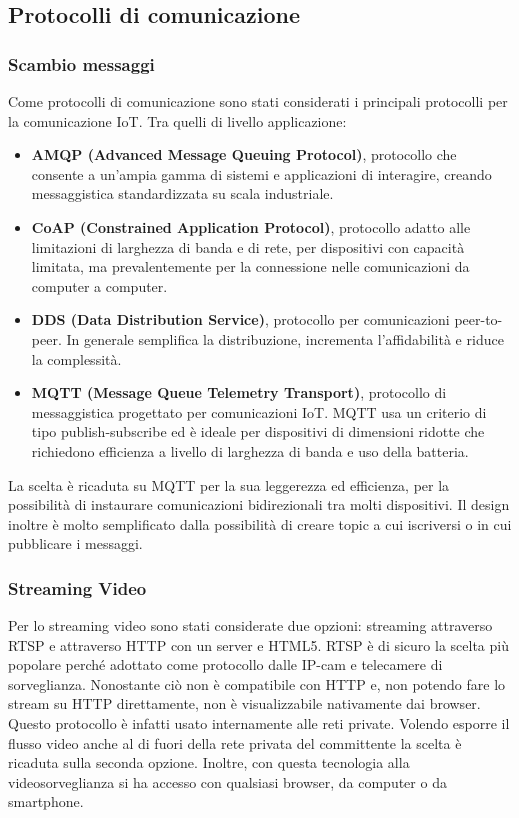         \subsection{Protocolli di comunicazione}
        \subsubsection{Scambio messaggi}
        Come protocolli di comunicazione sono stati considerati i principali protocolli per la comunicazione IoT. Tra quelli di livello applicazione: 
        \begin{itemize}
            \item \textbf{AMQP (Advanced Message Queuing Protocol)}, protocollo che consente a un'ampia gamma di sistemi e applicazioni di interagire, creando messaggistica standardizzata su scala industriale.
            \item \textbf{CoAP (Constrained Application Protocol)}, protocollo adatto alle limitazioni di larghezza di banda e di rete, per dispositivi con capacità limitata, ma prevalentemente per la connessione nelle comunicazioni da computer a computer. 
            \item \textbf{DDS (Data Distribution Service)}, protocollo per comunicazioni peer-to-peer. In generale semplifica la distribuzione, incrementa l'affidabilità e riduce la complessità.
            \item \textbf{MQTT (Message Queue Telemetry Transport)}, protocollo di messaggistica progettato per comunicazioni IoT. MQTT usa un criterio di tipo publish-subscribe ed è ideale per dispositivi di dimensioni ridotte che richiedono efficienza a livello di larghezza di banda e uso della batteria.
        \end{itemize}
        La scelta è ricaduta su MQTT per la sua leggerezza ed efficienza, per la possibilità di instaurare comunicazioni bidirezionali tra molti dispositivi. Il design inoltre è molto semplificato dalla possibilità di creare topic a cui iscriversi o in cui pubblicare i messaggi.
        
        \subsubsection{Streaming Video}
        Per lo streaming video sono stati considerate due opzioni: streaming attraverso RTSP e attraverso HTTP con un server e HTML5. 
        RTSP è di sicuro la scelta più popolare perché adottato come protocollo dalle IP-cam e telecamere di sorveglianza. Nonostante ciò non è compatibile con HTTP e, non potendo fare lo stream su HTTP direttamente, non è visualizzabile nativamente dai browser. Questo protocollo è infatti usato internamente alle reti private. Volendo esporre il flusso video anche al di fuori della rete privata del committente la scelta è ricaduta sulla seconda opzione. Inoltre, con questa tecnologia alla videosorveglianza si ha accesso con qualsiasi browser, da computer o da smartphone.
        
